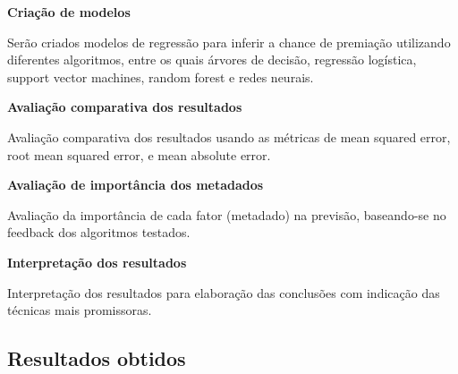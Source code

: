             \textbf{Criação de modelos}\par
            Serão criados modelos de regressão para inferir a chance de premiação utilizando diferentes algoritmos, entre os quais árvores de decisão, regressão logística, support vector machines, random forest e redes neurais.\newline

            \textbf{Avaliação comparativa dos resultados}\par
            Avaliação comparativa dos resultados usando as métricas de mean squared error, root mean squared error, e mean absolute error.\newline

            \textbf{Avaliação de importância dos metadados}\par
            Avaliação da importância de cada fator (metadado) na previsão, baseando-se no feedback dos algoritmos testados.\newline

            \textbf{Interpretação dos resultados}\par
            Interpretação dos resultados para elaboração das conclusões com indicação das técnicas mais promissoras.\newline

        \subsection{Resultados obtidos}


